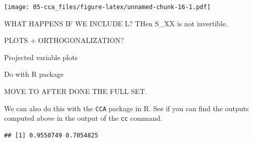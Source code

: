 \documentclass[]{book}
\newenvironment{Shaded}{\begin{snugshade}}{\end{snugshade}}
\newcommand{\CommentTok}[1]{\textcolor[rgb]{0.56,0.35,0.01}{\textit{#1}}}
\newcommand{\DataTypeTok}[1]{\textcolor[rgb]{0.13,0.29,0.53}{#1}}
\newcommand{\DecValTok}[1]{\textcolor[rgb]{0.00,0.00,0.81}{#1}}
\newcommand{\KeywordTok}[1]{\textcolor[rgb]{0.13,0.29,0.53}{\textbf{#1}}}
\newcommand{\NormalTok}[1]{#1}
\newcommand{\OperatorTok}[1]{\textcolor[rgb]{0.81,0.36,0.00}{\textbf{#1}}}
\newcommand{\StringTok}[1]{\textcolor[rgb]{0.31,0.60,0.02}{#1}}
\theoremstyle{definition}
\theoremstyle{definition}
\theoremstyle{definition}
\theoremstyle{remark}
\begin{document}
\begin{Shaded}
\end{Shaded}

\texttt{[image: 05-cca\_files/figure-latex/unnamed-chunk-16-1.pdf]}

WHAT HAPPENS IF WE INCLUDE L? THen S\_XX is not invertible.

PLOTS + ORTHOGONALIZATION?

Projected variable plots

Do with R package

MOVE TO AFTER DONE THE FULL SET.

We can also do this with the \texttt{CCA} package in R. See if you can find the outputs computed above in the output of the \texttt{cc} command.

\begin{Shaded}
\end{Shaded}

\begin{verbatim}
## [1] 0.9550749 0.7054825
\end{verbatim}

\begin{Shaded}
\end{Shaded}
\end{document}
